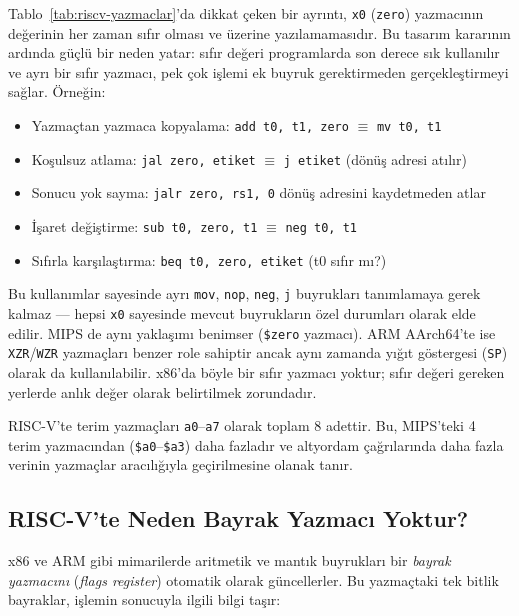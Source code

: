 Tablo~\ref{tab:riscv-yazmaclar}'da dikkat çeken bir ayrıntı, \texttt{x0} (\texttt{zero}) yazmacının değerinin her zaman sıfır olması ve üzerine yazılamamasıdır. Bu tasarım kararının ardında güçlü bir neden yatar: sıfır değeri programlarda son derece sık kullanılır ve ayrı bir sıfır yazmacı, pek çok işlemi ek buyruk gerektirmeden gerçekleştirmeyi sağlar. Örneğin:

\begin{itemize}[nosep]
\item Yazmaçtan yazmaca kopyalama: \texttt{add t0, t1, zero} $\equiv$ \texttt{mv t0, t1}
\item Koşulsuz atlama: \texttt{jal zero, etiket} $\equiv$ \texttt{j etiket} (dönüş adresi atılır)
\item Sonucu yok sayma: \texttt{jalr zero, rs1, 0} dönüş adresini kaydetmeden atlar
\item İşaret değiştirme: \texttt{sub t0, zero, t1} $\equiv$ \texttt{neg t0, t1}
\item Sıfırla karşılaştırma: \texttt{beq t0, zero, etiket} (t0 sıfır mı?)
\end{itemize}

Bu kullanımlar sayesinde ayrı \texttt{mov}, \texttt{nop}, \texttt{neg}, \texttt{j} buyrukları tanımlamaya gerek kalmaz --- hepsi \texttt{x0} sayesinde mevcut buyrukların özel durumları olarak elde edilir. MIPS de aynı yaklaşımı benimser (\texttt{\$zero} yazmacı). ARM AArch64'te ise \texttt{XZR}/\texttt{WZR} yazmaçları benzer role sahiptir ancak aynı zamanda yığıt göstergesi (\texttt{SP}) olarak da kullanılabilir. x86'da böyle bir sıfır yazmacı yoktur; sıfır değeri gereken yerlerde anlık değer olarak belirtilmek zorundadır.

RISC-V'te terim yazmaçları \texttt{a0}--\texttt{a7} olarak toplam 8 adettir. Bu, MIPS'teki 4 terim yazmacından (\texttt{\$a0}--\texttt{\$a3}) daha fazladır ve altyordam çağrılarında daha fazla verinin yazmaçlar aracılığıyla geçirilmesine olanak tanır.

\subsection{RISC-V'te Neden Bayrak Yazmacı Yoktur?}
\label{subsec:bayrak-yazmaci}

x86 ve ARM gibi mimarilerde aritmetik ve mantık buyrukları bir \emph{bayrak yazmacını} (\emph{flags register}) otomatik olarak güncellerler. Bu yazmaçtaki tek bitlik bayraklar, işlemin sonucuyla ilgili bilgi taşır:

